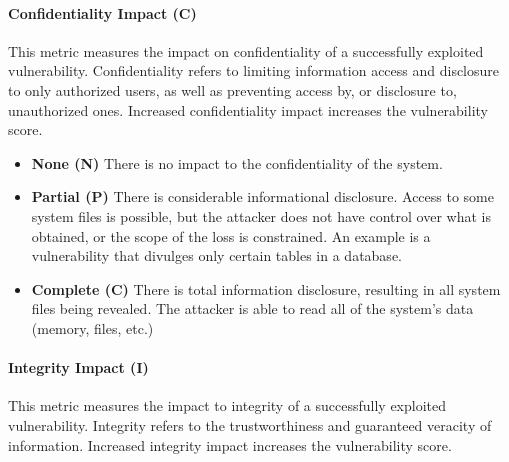         \paragraph{Confidentiality Impact (C)}\label{par:confidentiality-impact-c}

          This metric measures the impact on confidentiality of a successfully
          exploited vulnerability. Confidentiality refers to limiting information
          access and disclosure to only authorized users, as well as preventing
          access by, or disclosure to, unauthorized ones. Increased
          confidentiality impact increases the vulnerability score.

          \begin{itemize}
            \item
              \textbf{None (N)} There is no impact to the confidentiality of the
              system.
            \item
              \textbf{Partial (P)} There is considerable informational disclosure.
              Access to some system files is possible, but the attacker does not
              have control over what is obtained, or the scope of the loss is
              constrained. An example is a vulnerability that divulges only certain
              tables in a database.
            \item
              \textbf{Complete (C)} There is total information disclosure, resulting
              in all system files being revealed. The attacker is able to read all
              of the system's data (memory, files, etc.)
          \end{itemize}

        \paragraph{Integrity Impact (I)}\label{par:integrity-impact-i}

          This metric measures the impact to integrity of a successfully exploited
          vulnerability. Integrity refers to the trustworthiness and guaranteed
          veracity of information. Increased integrity impact increases the
          vulnerability score.

